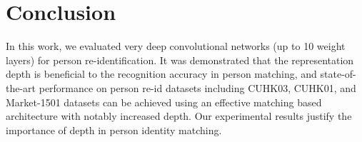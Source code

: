 \documentclass[10pt,journal,twocolumn]{IEEEtran}
\begin{document}
\section{Conclusion}\label{sec:con}

In this work, we evaluated very deep convolutional networks (up to 10 weight layers) for person re-identification. It was demonstrated that the representation depth is beneficial to the recognition accuracy in person matching, and state-of-the-art performance on person re-id datasets including CUHK03, CUHK01, and Market-1501 datasets can be achieved using an effective matching based architecture \cite{FPNN,JointRe-id} with notably increased depth. Our experimental results justify the importance of depth in person identity matching.


%
%
\ifCLASSOPTIONcaptionsoff
  \newpage
\fi


%

%
%
%
%
%

\small


%
%
%
%
%
%
%
%
%
%
%
%
%

%
%
%
%
%
%
%
%
%
%

%
%
%
%
%
%

%
%
%
%

%
%
%

%
%
%
%
%

%

%
%
%



%
\end{document}
